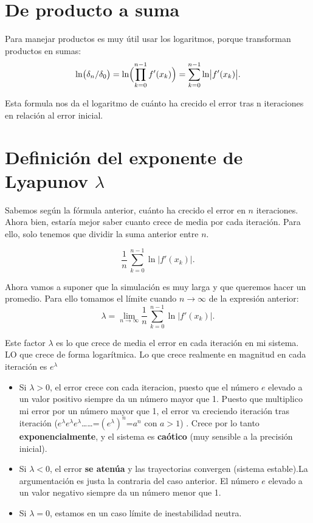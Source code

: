 \documentclass[
  10pt,
  a4paper,
  DIV=11,
  numbers=noendperiod,
  open=any]{scrreprt}
\providecommand{\tightlist}{%
  \setlength{\itemsep}{0pt}\setlength{\parskip}{0pt}}
\numberwithin{equation}{chapter}
\numberwithin{equation}{chapter}
\renewcommand{\[}{\begin{equation}}
\renewcommand{\]}{\end{equation}}
\begin{document}
\section{De producto a suma}\label{de-producto-a-suma}

Para manejar productos es muy útil usar los logaritmos, porque
transforman productos en sumas: \[
\ln\bigl(\delta_n/\delta_0\bigr)
= \ln\Bigl(\prod_{k=0}^{n-1} f'(x_k)\Bigr)
= \sum_{k=0}^{n-1}\ln\bigl|f'(x_k)\bigr|.
\]

Esta formula nos da el logaritmo de cuánto ha crecido el error tras n
iteraciones en relación al error inicial.

\section{\texorpdfstring{Definición del exponente de Lyapunov
\(\lambda\)}{Definición del exponente de Lyapunov \textbackslash lambda}}\label{definiciuxf3n-del-exponente-de-lyapunov-lambda}

Sabemos según la fórmula anterior, cuánto ha crecido el error en \(n\)
iteraciones. Ahora bien, estaría mejor saber cuanto crece de media por
cada iteración. Para ello, solo tenemos que dividir la suma anterior
entre \(n\).

\begin{equation}

\frac{1}{n}\,\sum_{k=0}^{n-1}\ln\bigl|f'(x_k)\bigr|.

\end{equation}

Ahora vamos a suponer que la simulación es muy larga y que queremos
hacer un promedio. Para ello tomamos el límite cuando \(n\to\infty\) de
la expresión anterior: \[
\lambda
= \lim_{n\to\infty}
\frac{1}{n}\,\sum_{k=0}^{n-1}\ln\bigl|f'(x_k)\bigr|.
\]

Este factor \(\lambda\) es lo que crece de media el error en cada
iteración en mi sistema. LO que crece de forma logarítmica. Lo que crece
realmente en magnitud en cada iteración es \(e^\lambda\)

\begin{itemize}
\tightlist
\item
  Si \(\lambda>0\), el error crece con cada iteracion, puesto que el
  número \(e\) elevado a un valor positivo siempre da un número mayor
  que 1. Puesto que multiplico mi error por un número mayor que 1, el
  error va creciendo iteración tras iteración
  (\(e^\lambda\)\(e^\lambda\)\(e^\lambda\)\ldots\ldots=\((e^\lambda)^n\)=\(a^n\)
  con \(a>1\)) . Crece por lo tanto \textbf{exponencialmente}, y el
  sistema es \textbf{caótico} (muy sensible a la precisión inicial).
\item
  Si \(\lambda<0\), el error \textbf{se atenúa} y las trayectorias
  convergen (sistema estable).La argumentación es justa la contraria del
  caso anterior. El número \(e\) elevado a un valor negativo siempre da
  un número menor que 1.
\item
  Si \(\lambda=0\), estamos en un caso límite de inestabilidad neutra.
\end{itemize}
\end{document}

